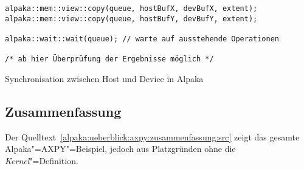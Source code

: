 \begin{code}
    \begin{verbatim}
alpaka::mem::view::copy(queue, hostBufX, devBufX, extent);
alpaka::mem::view::copy(queue, hostBufY, devBufY, extent);

alpaka::wait::wait(queue); // warte auf ausstehende Operationen

/* ab hier Überprüfung der Ergebnisse möglich */
    \end{verbatim}
    \caption{Synchronisation zwischen Host und Device in Alpaka}
    \label{alpaka:ueberblick:axpy:sync:src}
\end{code}

\subsection{Zusammenfassung}
\label{alpaka:ueberblick:axpy:zusammenfassung}

Der Quelltext~\ref{alpaka:ueberblick:axpy:zusammenfassung:src} zeigt das gesamte
Alpaka"=AXPY"=Beispiel, jedoch aus Platzgründen ohne die
\textit{Kernel}"=Definition.


